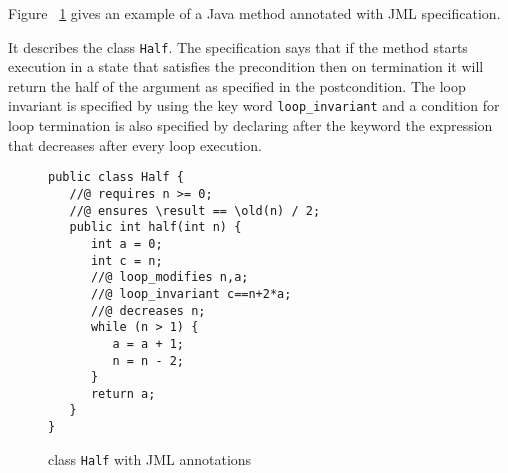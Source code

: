 Figure ~\ref{halfSrc} gives an example of a Java method annotated with JML specification.

It describes the class \texttt{Half}.
The specification says that if the method starts execution in a state that satisfies the precondition then on termination it will return the half of the argument as specified in the postcondition. The loop invariant is specified by using the key word \texttt{loop\_invariant} and a condition for loop termination is also specified by declaring after the keyword  the expression that decreases after every loop execution. 
\begin{figure}[ht!]
\begin{verbatim}
public class Half {	
   //@ requires n >= 0;
   //@ ensures \result == \old(n) / 2; 	 
   public int half(int n) {
      int a = 0;
      int c = n;
      //@ loop_modifies n,a;
      //@ loop_invariant c==n+2*a;
      //@ decreases n;
      while (n > 1) {
         a = a + 1;
         n = n - 2;
      }
      return a;
   }
} 
\end{verbatim}
\caption{class \texttt{Half} with JML annotations} 
\label{halfSrc}
\end{figure}
